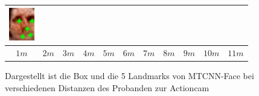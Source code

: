 \begin{figure}
\begin{tabular}{|c|c|c|c|c|c|c|c|c|c|c|}
		\includegraphics[width=1.1cm]{img_MTCNN/Img11-4_pupil1}\\
		\hline
		$1m$& $2m$& $3m$& $4m$& $5m$& $6m$& $7m$& $8m$& $9m$& $10m$& $11m$\\\hline
	\end{tabular}
	\caption{Dargestellt ist die Box und die 5 Landmarks von MTCNN-Face bei verschiedenen Distanzen des Probanden zur Actioncam}
	\label{img_bereich_MTCNN}
\end{figure}

